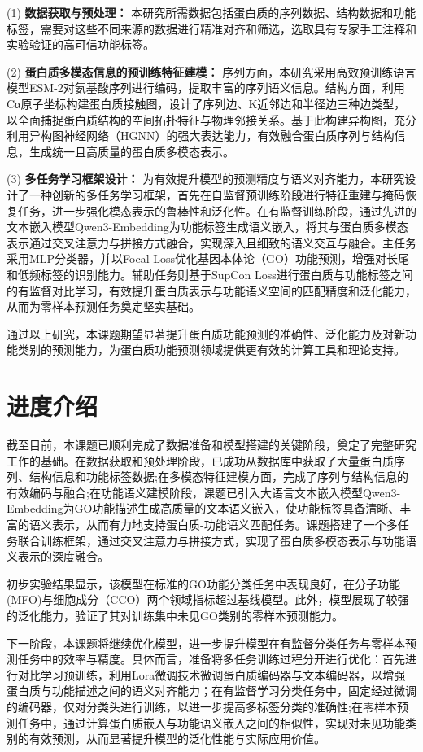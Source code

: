 (1) \textbf{数据获取与预处理：} 本研究所需数据包括蛋白质的序列数据、结构数据和功能标签，需要对这些不同来源的数据进行精准对齐和筛选，选取具有专家手工注释和实验验证的高可信功能标签。

(2) \textbf{蛋白质多模态信息的预训练特征建模：} 序列方面，本研究采用高效预训练语言模型ESM-2\cite{doi:10.1073/pnas.2016239118}对氨基酸序列进行编码，提取丰富的序列语义信息。结构方面，利用Cα原子坐标构建蛋白质接触图，设计了序列边、K近邻边和半径边三种边类型，以全面捕捉蛋白质结构的空间拓扑特征与物理邻接关系。基于此构建异构图，充分利用异构图神经网络（HGNN\cite{zhang2019heterogeneous}）的强大表达能力，有效融合蛋白质序列与结构信息，生成统一且高质量的蛋白质多模态表示。

(3) \textbf{多任务学习框架设计：} 为有效提升模型的预测精度与语义对齐能力，本研究设计了一种创新的多任务学习框架，首先在自监督预训练阶段进行特征重建与掩码恢复任务，进一步强化模态表示的鲁棒性和泛化性。在有监督训练阶段，通过先进的文本嵌入模型Qwen3-Embedding\cite{qwen3embedding}为功能标签生成语义嵌入，将其与蛋白质多模态表示通过交叉注意力与拼接方式融合，实现深入且细致的语义交互与融合。主任务采用MLP分类器\cite{taud2017multilayer}，并以Focal Loss\cite{lin2017focal}优化基因本体论（GO）功能预测，增强对长尾和低频标签的识别能力。辅助任务则基于SupCon Loss\cite{khosla2020supervised}进行蛋白质与功能标签之间的有监督对比学习，有效提升蛋白质表示与功能语义空间的匹配精度和泛化能力，从而为零样本预测任务奠定坚实基础。

通过以上研究，本课题期望显著提升蛋白质功能预测的准确性、泛化能力及对新功能类别的预测能力，为蛋白质功能预测领域提供更有效的计算工具和理论支持。




\section{进度介绍}

截至目前，本课题已顺利完成了数据准备和模型搭建的关键阶段，奠定了完整研究工作的基础。在数据获取和预处理阶段，已成功从数据库中获取了大量蛋白质序列、结构信息和功能标签数据;在多模态特征建模方面，完成了序列与结构信息的有效编码与融合;在功能语义建模阶段，课题已引入大语言文本嵌入模型Qwen3-Embedding为GO功能描述生成高质量的文本语义嵌入，使功能标签具备清晰、丰富的语义表示，从而有力地支持蛋白质-功能语义匹配任务。课题搭建了一个多任务联合训练框架，通过交叉注意力与拼接方式，实现了蛋白质多模态表示与功能语义表示的深度融合。

初步实验结果显示，该模型在标准的GO功能分类任务中表现良好，在分子功能(MFO)与细胞成分（CCO）两个领域指标超过基线模型。此外，模型展现了较强的泛化能力，验证了其对训练集中未见GO类别的零样本预测能力。

下一阶段，本课题将继续优化模型，进一步提升模型在有监督分类任务与零样本预测任务中的效率与精度。具体而言，准备将多任务训练过程分开进行优化：首先进行对比学习预训练，利用Lora微调技术\cite{devalal2018lora}微调蛋白质编码器与文本编码器，以增强蛋白质与功能描述之间的语义对齐能力；在有监督学习分类任务中，固定经过微调的编码器，仅对分类头进行训练，以进一步提高多标签分类的准确性;在零样本预测任务中，通过计算蛋白质嵌入与功能语义嵌入之间的相似性，实现对未见功能类别的有效预测，从而显著提升模型的泛化性能与实际应用价值。

